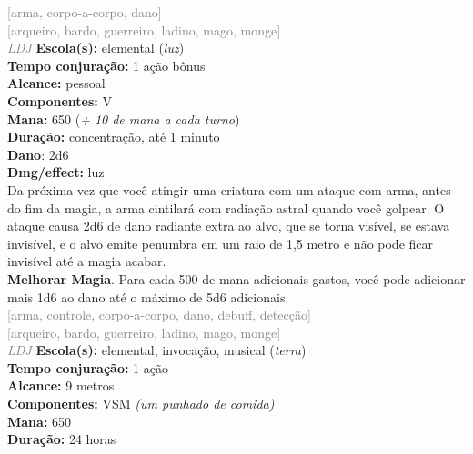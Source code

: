 \documentclass{RPG_Adventure}[2021/10/20]
\begin{document}
{\scriptsize \textcolor{gray}{[arma, corpo-a-corpo, dano]\\}}
{\scriptsize \textcolor{gray}{[arqueiro, bardo, guerreiro, ladino, mago, monge]\\}}
{\tiny \textcolor{gray}{\textit{LDJ}}}\jump{}
{\small \t \textbf{Escola(s):} elemental (\textit{luz})\\\t \textbf{Tempo conjuração:} 1 ação bônus\\\t \textbf{Alcance:} pessoal\\\t \textbf{Componentes:} V\\\t \textbf{Mana:} 650 (\textit{+ 10 de mana a cada turno})\\\t \textbf{Duração:} concentração, até 1 minuto\\\t \textbf{Dano}: 2d6\\\t \textbf{Dmg/effect:} luz\\}
{\normalsize Da próxima vez que você atingir uma criatura com um ataque com arma, antes do fim da magia, a arma cintilará com radiação astral quando você golpear. O ataque causa 2d6 de dano radiante extra ao alvo, que se torna visível, se estava invisível, e o alvo emite penumbra em um raio de 1,5 metro e não pode ficar invisível até a magia acabar.\\\t \textbf{Melhorar Magia}. Para cada 500 de mana adicionais gastos, você pode adicionar mais 1d6 ao dano até o máximo de 5d6 adicionais.\\}
{\scriptsize \textcolor{gray}{[arma, controle, corpo-a-corpo, dano, debuff, detecção]\\}}
{\scriptsize \textcolor{gray}{[arqueiro, bardo, guerreiro, ladino, mago, monge]\\}}
{\tiny \textcolor{gray}{\textit{LDJ}}}\jump{}
{\small \t \textbf{Escola(s):} elemental, invocação, musical (\textit{terra})\\\t \textbf{Tempo conjuração:} 1 ação\\\t \textbf{Alcance:} 9 metros\\\t \textbf{Componentes:} VSM \textit{(um punhado de comida)}\\\t \textbf{Mana:} 650\\\t \textbf{Duração:} 24 horas\\}
\end{document}
